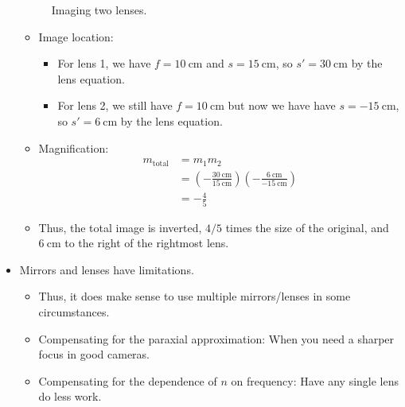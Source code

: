 \documentclass[../notes.tex]{subfiles}
\begin{document}
\begin{itemize}
\begin{figure}[h!]
        \caption{Imaging two lenses.}
        \label{fig:twoLensImage}
    \end{figure}
    \begin{itemize}
        \item Image location:
        \begin{itemize}
            \item For lens 1, we have $f=\SI{10}{\centi\meter}$ and $s=\SI{15}{\centi\meter}$, so $s'=\SI{30}{\centi\meter}$ by the lens equation.
            \item For lens 2, we still have $f=\SI{10}{\centi\meter}$ but now we have have $s=\SI{-15}{\centi\meter}$, so $s'=\SI{6}{\centi\meter}$ by the lens equation.
        \end{itemize}
        \item Magnification:
        \begin{align*}
            m_\text{total} &= m_1m_2\\
            &= \left( -\frac{\SI{30}{\centi\meter}}{\SI{15}{\centi\meter}} \right)\left( -\frac{\SI{6}{\centi\meter}}{\SI{-15}{\centi\meter}} \right)\\
            &= -\frac{4}{5}
        \end{align*}
        \item Thus, the total image is inverted, $4/5$ times the size of the original, and $\SI{6}{\centi\meter}$ to the right of the rightmost lens.
    \end{itemize}
    \item Mirrors and lenses have limitations.
    \begin{itemize}
        \item Thus, it does make sense to use multiple mirrors/lenses in some circumstances.
        \item Compensating for the paraxial approximation: When you need a sharper focus in good cameras.
        \item Compensating for the dependence of $n$ on frequency: Have any single lens do less work.
    \end{itemize}
\end{itemize}
\end{document}
